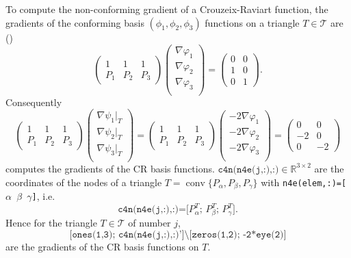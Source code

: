 To compute the non-conforming gradient of a Crouzeix-Raviart function, the
gradients of the conforming basis $(\phi_1,\phi_2,\phi_3)$ functions on a triangle $T\in\mathcal T$
are (\cite{Carstensen2017script,CarstensenBrennerFEM})
\begin{equation*}
  \begin{pmatrix}
    1 & 1 & 1\\
    P_1 & P_2 & P_3
  \end{pmatrix}
  \begin{pmatrix}
    \nabla \varphi_1\\
    \nabla \varphi_2\\
    \nabla \varphi_3\\
  \end{pmatrix}
  =
  \begin{pmatrix}
    0 & 0 \\
    1 & 0\\
    0&1
  \end{pmatrix}.
\end{equation*}
Consequently
\begin{equation*}
  \begin{pmatrix}
    1 & 1 & 1\\
    P_1 & P_2 & P_3
  \end{pmatrix}
  \begin{pmatrix}
    \nabla \psi_1|_T\\
    \nabla \psi_2|_T\\
    \nabla \psi_3|_T\\
  \end{pmatrix}
  =
  \begin{pmatrix}
    1 & 1 & 1\\
    P_1 & P_2 & P_3
  \end{pmatrix}
  \begin{pmatrix}
   -2 \nabla \varphi_1\\
   -2 \nabla \varphi_2\\
   -2 \nabla \varphi_3\\
  \end{pmatrix}
  =
  \begin{pmatrix}
    0 & 0 \\
    -2 & 0\\
    0&-2
  \end{pmatrix}
\end{equation*}
computes the gradients of the CR basis functions. 
$\texttt{c4n(n4e(j,:),:)}\in\mathbb R^{3\times 2}$ 
are the coordinates of the nodes of a triangle
$T=\operatorname{conv}\{P_\alpha,P_\beta,P_\gamma\}$ with 
\texttt{n4e(elem,:)=[$\alpha$ $\beta$ $\gamma$]}, i.e. 
\[
\texttt{c4n(n4e(j,:),:)=[$P_\alpha^T$; $P_\beta^T$; $P_\gamma^T$]}.
\]
Hence for the triangle $T\in\mathcal T$ of number $j$,
\[
\texttt{[ones(1,3); c4n(n4e(j,:),:)']\textbackslash[zeros(1,2); -2*eye(2)]}
\]
are the gradients of the CR basis functions on $T$.


